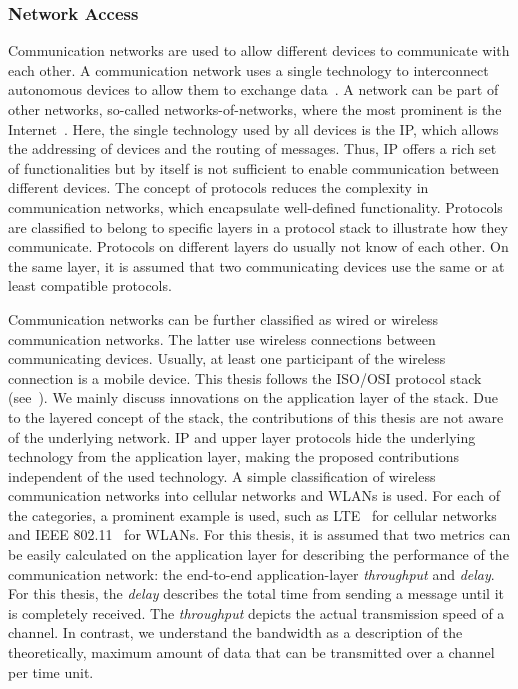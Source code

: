 \subsubsection{Network Access}
Communication networks are used to allow different devices to communicate with each other.
A communication network uses a single technology to interconnect autonomous devices to allow them to exchange data~\cite{tanenbaum2003computer}.
A network can be part of other networks, so-called networks-of-networks, where the most prominent is the Internet~\cite{tanenbaum2003computer}.
Here, the single technology used by all devices is the \ac{IP}, which allows the addressing of devices and the routing of messages.
Thus, \ac{IP} offers a rich set of functionalities but by itself is not sufficient to enable communication between different devices.
The concept of protocols reduces the complexity in communication networks, which encapsulate well-defined functionality.
Protocols are classified to belong to specific layers in a protocol stack to illustrate how they communicate.
Protocols on different layers do usually not know of each other.
On the same layer, it is assumed that two communicating devices use the same or at least compatible protocols.

Communication networks can be further classified as wired or wireless communication networks.
The latter use wireless connections between communicating devices. Usually, at least one participant of the wireless connection is a mobile device.
This thesis follows the \ac{ISO}/\ac{OSI} protocol stack (see~\cite{tanenbaum2003computer}).
We mainly discuss innovations on the application layer of the stack.
Due to the layered concept of the stack, the contributions of this thesis are not aware of the underlying network.
\ac{IP} and upper layer protocols hide the underlying technology from the application layer, making the proposed contributions independent of the used technology.
A simple classification of wireless communication networks into cellular networks and \acp{WLAN} is used.
For each of the categories, a prominent example is used, such as \ac{LTE}~\cite{Astely2009} for cellular networks and \ac{IEEE} 802.11~\cite{tanenbaum2003computer} for \acp{WLAN}.
For this thesis, it is assumed that two metrics can be easily calculated on the application layer for describing the performance of the communication network: the end-to-end application-layer \emph{throughput} and \emph{delay}. 
For this thesis, the \emph{delay} describes the total time from sending a message until it is completely received.
The \emph{throughput} depicts the actual transmission speed of a channel.
In contrast, we understand the bandwidth as a description of the theoretically, maximum amount of data that can be transmitted over a channel per time unit.
